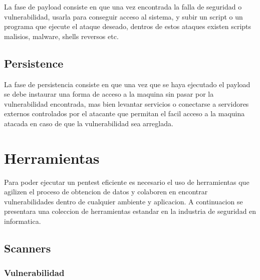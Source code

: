 La fase de payload consiste en que una vez encontrada la falla de seguridad o vulnerabilidad, usarla para conseguir acceso al sistema, y subir un script o un programa que ejecute el ataque deseado, dentros de estos ataques existen scripts malisios, malware, shells reversos etc.

\subsection{Persistence}

La fase de persistencia consiste en que una vez que se haya ejecutado el payload se debe instaurar una forma de acceso a la maquina sin pasar por la vulnerabilidad encontrada, mas bien levantar servicios o conectarse a servidores externos controlados por el atacante que permitan el facil acceso a la maquina atacada en caso de que la vulnerabilidad sea arreglada.



\section{Herramientas}

Para poder ejecutar un pentest eficiente es necesario el uso de herramientas que agilizen el proceso de obtencion de datos y colaboren en encontrar vulnerabilidades dentro de cualquier ambiente y aplicacion. A continuacion se presentara una coleccion de herramientas estandar en la industria de seguridad en informatica.

\subsection{Scanners}

\subsubsection{Vulnerabilidad}

